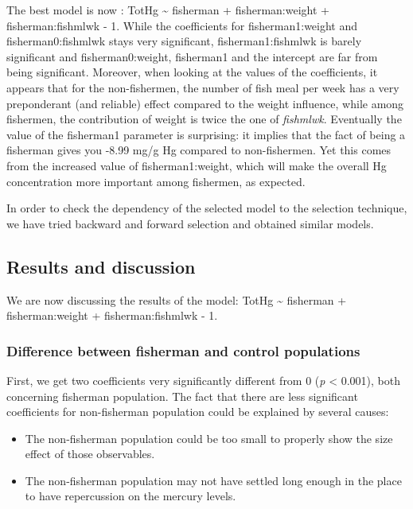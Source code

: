 \documentclass[12pt,]{article}
\providecommand{\tightlist}{%
  \setlength{\itemsep}{0pt}\setlength{\parskip}{0pt}}
\begin{document}
The best model is now : TotHg \textasciitilde{} fisherman +
fisherman:weight + fisherman:fishmlwk - 1. While the coefficients for
fisherman1:weight and fisherman0:fishmlwk stays very significant,
fisherman1:fishmlwk is barely significant and fisherman0:weight,
fisherman1 and the intercept are far from being significant. Moreover,
when looking at the values of the coefficients, it appears that for the
non-fishermen, the number of fish meal per week has a very preponderant
(and reliable) effect compared to the weight influence, while among
fishermen, the contribution of weight is twice the one of
\emph{fishmlwk}. Eventually the value of the fisherman1 parameter is
surprising: it implies that the fact of being a fisherman gives you
-8.99 mg/g Hg compared to non-fishermen. Yet this comes from the
increased value of fisherman1:weight, which will make the overall Hg
concentration more important among fishermen, as expected.

In order to check the dependency of the selected model to the selection
technique, we have tried backward and forward selection and obtained
similar models.

\subsection{Results and discussion}\label{results-and-discussion}

We are now discussing the results of the model: TotHg \textasciitilde{}
fisherman + fisherman:weight + fisherman:fishmlwk - 1.

\subsubsection{Difference between fisherman and control
populations}\label{difference-between-fisherman-and-control-populations}

First, we get two coefficients very significantly different from 0
(\emph{p} \textless{} 0.001), both concerning fisherman population. The
fact that there are less significant coefficients for non-fisherman
population could be explained by several causes:

\begin{itemize}
\tightlist
\item
  The non-fisherman population could be too small to properly show the
  size effect of those observables.
\item
  The non-fisherman population may not have settled long enough in the
  place to have repercussion on the mercury levels.
\end{itemize}
\end{document}
